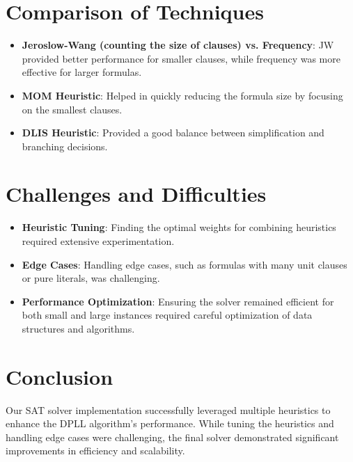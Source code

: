 \documentclass[titlepage]{article}
\begin{document}
\section*{Comparison of Techniques}
\begin{itemize}
    \item \textbf{Jeroslow-Wang (counting the size of clauses) vs. Frequency}: JW provided better performance for smaller clauses, while frequency was more effective for larger formulas.
    \item \textbf{MOM Heuristic}: Helped in quickly reducing the formula size by focusing on the smallest clauses.
    \item \textbf{DLIS Heuristic}: Provided a good balance between simplification and branching decisions.
\end{itemize}

\section*{Challenges and Difficulties}
\begin{itemize}
    \item \textbf{Heuristic Tuning}: Finding the optimal weights for combining heuristics required extensive experimentation.
    \item \textbf{Edge Cases}: Handling edge cases, such as formulas with many unit clauses or pure literals, was challenging.
    \item \textbf{Performance Optimization}: Ensuring the solver remained efficient for both small and large instances required careful optimization of data structures and algorithms.
\end{itemize}

\section*{Conclusion}
Our SAT solver implementation successfully leveraged multiple heuristics to enhance the DPLL algorithm's performance. While tuning the heuristics and handling edge cases were challenging, the final solver demonstrated significant improvements in efficiency and scalability.
\end{document}
